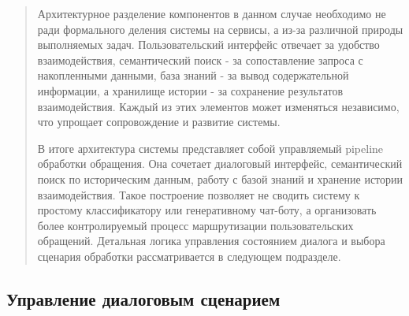 \begin{quote}
Архитектурное разделение компонентов в данном случае необходимо не ради
формального деления системы на сервисы, а из-за различной природы
выполняемых задач. Пользовательский интерфейс отвечает за удобство
взаимодействия, семантический поиск - за сопоставление запроса с
накопленными данными, база знаний - за вывод содержательной информации,
а хранилище истории - за сохранение результатов взаимодействия. Каждый
из этих элементов может изменяться независимо, что упрощает
сопровождение и развитие системы.

В итоге архитектура системы представляет собой управляемый pipeline
обработки обращения. Она сочетает диалоговый интерфейс, семантический
поиск по историческим данным, работу с базой знаний и хранение истории
взаимодействия. Такое построение позволяет не сводить систему к простому
классификатору или генеративному чат-боту, а организовать более
контролируемый процесс маршрутизации пользовательских обращений.
Детальная логика управления состоянием диалога и выбора сценария
обработки рассматривается в следующем подразделе.
\end{quote}

\hypertarget{ux443ux43fux440ux430ux432ux43bux435ux43dux438ux435-ux434ux438ux430ux43bux43eux433ux43eux432ux44bux43c-ux441ux446ux435ux43dux430ux440ux438ux435ux43c}{%
\subsection{Управление диалоговым
сценарием}\label{ux443ux43fux440ux430ux432ux43bux435ux43dux438ux435-ux434ux438ux430ux43bux43eux433ux43eux432ux44bux43c-ux441ux446ux435ux43dux430ux440ux438ux435ux43c}}

